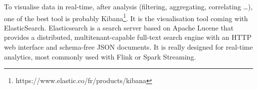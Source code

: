To visualise data in real-time, after analysis (filtering, aggregating, correlating …), one of the best tool is probably Kibana\footnote{ https://www.elastic.co/fr/products/kibana}.
It is the visualisation tool coming with ElasticSearch.
Elasticsearch is a search server based on Apache Lucene that provides a distributed, multitenant-capable full-text search engine with an HTTP web interface and schema-free JSON documents.
It is really designed for real-time analytics, most commonly used with Flink or Spark Streaming.

